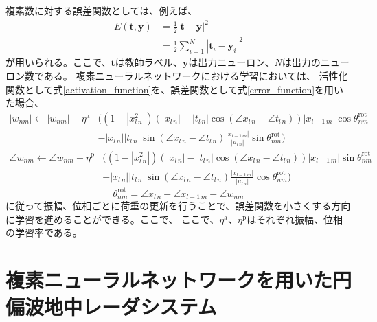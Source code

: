 \documentclass[11pt,a4paper,uplatex]{ujarticle}
\begin{document}
    複素数に対する誤差関数としては、例えば、
    \begin{equation}\label{error_function}
      \begin{split}
      E(\bm{t}, \bm{y})  & = \frac{1}{2}|\bm{t} - \bm{y}|^2\\
      & = \frac{1}{2}\sum_{i=1}^{N}|\bm{t}_i - \bm{y}_i|^2
      \end{split}
    \end{equation}
    が用いられる。ここで、$\bm{t}$は教師ラベル、$\bm{y}$は出力ニューロン、$N$は出力のニューロン数である。
    複素ニューラルネットワークにおける学習においては、
    活性化関数として式\ref{activation_function}を、誤差関数として式\ref{error_function}を用いた場合、
    \begin{equation}
      \label{eq:update_a}
      \begin{split}
        |w_{nm}| \leftarrow |w_{nm}| - \eta^\mathrm{a} & \biggl( (1-|x_{l\,n}^2|)(|x_{l\, n}| - |t_{l\, n}| \cos (\angle x_{l\, n} - \angle t_{l\, n}))|x_{l-1\, m}| \cos \theta^{\mathrm{rot}}_{nm}  \\
                        & - |x_{l\, n}| |t_{l\, n}| \sin (\angle x_{l\, n} - \angle t_{l\, n}) \frac{|x_{l-1\, m}|}{|u_{l\, n}|} \sin \theta^{\mathrm{rot}}_{nm} \biggr)
      \end{split}
    \end{equation}
    \begin{equation}
      \label{eq:update_p}
      \begin{split}
        \angle w_{nm} \leftarrow \angle w_{nm} - \eta^\mathrm{p} & \bigg( (1-|x_{l\,n}^2|)(|x_{l\, n}| - |t_{l\, n}| \cos (\angle x_{l\, n} - \angle t_{l\, n}))|x_{l-1\, m}| \sin \theta^{\mathrm{rot}}_{nm} \\
                        &  + |x_{l\, n}| |t_{l\, n}| \sin (\angle x_{l\, n} - \angle t_{l\, n}) \frac{|x_{l-1\, m}|}{|u_{l\, n}|} \cos \theta^{\mathrm{rot}}_{nm} \bigg)
      \end{split}
    \end{equation}
    \begin{equation}
      \label{eq:rot}
        \theta^{\mathrm{rot}}_{nm} = \angle x_{l\, n} - \angle x_{l-1\, m} -\angle w_{nm}
    \end{equation}
    に従って振幅、位相ごとに荷重の更新を行うことで、誤差関数を小さくする方向に学習を進めることができる。ここで、
    ここで、$\eta^\mathrm{a}$、$\eta^\mathrm{p}$はそれぞれ振幅、位相の学習率である。
    \cite{CVNN}

\section{複素ニューラルネットワークを用いた円偏波地中レーダシステム}
\end{document}
